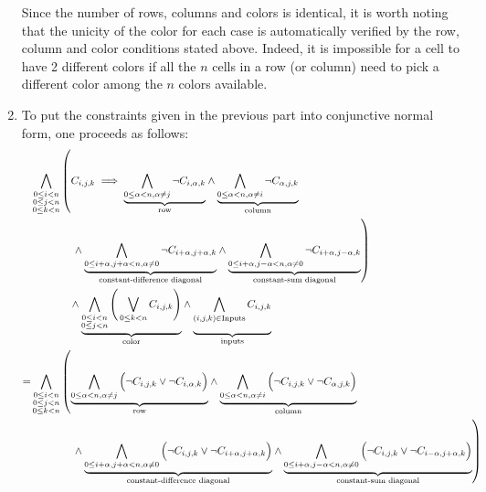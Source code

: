 \documentclass[journal,onecolumn]{IEEEtran}
\begin{document}
\begin{enumerate}
	Since the number of rows, columns and colors is identical, it is worth noting that the unicity of the color for each case is automatically verified by the row, column and color conditions stated above. Indeed, it is impossible for a cell to have 2 different colors if all the $n$ cells in a row (or column) need to pick a different color among the $n$ colors available.
	\item To put the constraints given in the previous part into conjunctive normal form, one proceeds as follows:
	\begin{align*}
	&\bigwedge_{\substack{0 \le i < n \\ 0 \le j < n \\ 0 \le k < n}} \left(C_{i, j, k} \implies {\underbrace{\bigwedge_{0 \le \alpha < n, \alpha \ne j} \lnot C_{i, \alpha, k}}_{\textnormal{row}}} \land {\underbrace{\bigwedge_{0 \le \alpha < n, \alpha \ne i} \lnot C_{\alpha, j, k}}_{\textnormal{column}}}\right. \\
	&\left. \qquad \qquad \! \! {} \land {\underbrace{\bigwedge_{0 \le i+\alpha, j+\alpha < n, \alpha \ne 0} \lnot C_{i+\alpha, j+\alpha, k}}_{\textnormal{constant-difference diagonal}}} \land {\underbrace{\bigwedge_{0 \le i+\alpha, j-\alpha < n, \alpha \ne 0} \lnot C_{i+\alpha, j-\alpha, k}}_{\textnormal{constant-sum diagonal}}}\right) \\
	&\qquad \qquad \! \! {} \land {\underbrace{\bigwedge_{\substack{0 \le i < n \\ 0 \le j < n}} \Bigg(\bigvee_{0 \le k < n} C_{i, j, k}\Bigg)}_{\textnormal{color}}} \land {\underbrace{\bigwedge_{(i, j, k) \in \textnormal{Inputs}} C_{i, j, k} \vphantom{\bigwedge_{\substack{0 \le j < n \\ 0 \le k < n}}}}_{\textnormal{inputs}}} \\
	=&\bigwedge_{\substack{0 \le i < n \\ 0 \le j < n \\ 0 \le k < n}} \left({\underbrace{\bigwedge_{0 \le \alpha < n, \alpha \ne j} \Big(\lnot C_{i, j, k} \lor \lnot C_{i, \alpha, k} \Big)}_{\textnormal{row}}} \land {\underbrace{\bigwedge_{0 \le \alpha < n, \alpha \ne i} \Big(\lnot C_{i, j, k} \lor \lnot C_{\alpha, j, k}\Big)}_{\textnormal{column}}} \right.\\
	&\left. \qquad \qquad \! \! {}  \land {\underbrace{\bigwedge_{0 \le i+\alpha, j+\alpha < n, \alpha \ne 0} \Big( \lnot C_{i, j, k} \lor \lnot C_{i + \alpha, j+\alpha, k}\Big)}_{\textnormal{constant-difference diagonal}}} \land {\underbrace{\bigwedge_{0 \le i+\alpha, j-\alpha < n, \alpha \ne 0} \Big( \lnot C_{i, j, k} \lor \lnot C_{i-\alpha, j+\alpha, k} \Big)}_{\textnormal{constant-sum diagonal}}}\right)\\

\end{align*}
\end{enumerate}
\end{document}
